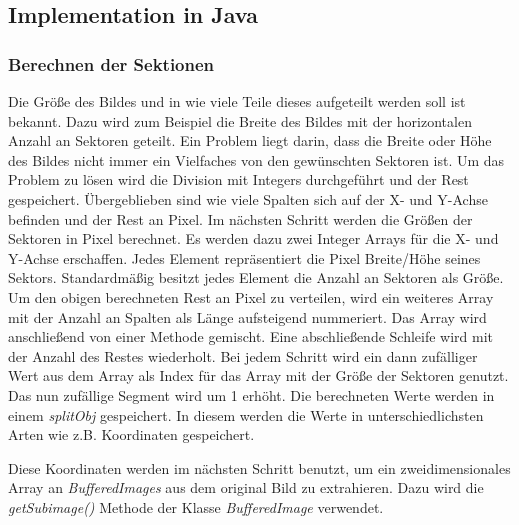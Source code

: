 \subsection{Implementation in Java}
\subsubsection{Berechnen der Sektionen}
Die Größe des Bildes und in wie viele Teile dieses aufgeteilt werden soll ist bekannt. Dazu wird zum Beispiel die Breite des Bildes mit der horizontalen Anzahl an Sektoren geteilt. Ein Problem liegt darin, dass die Breite oder Höhe des Bildes nicht immer ein Vielfaches von den gewünschten Sektoren ist. Um das Problem zu lösen wird die Division mit Integers durchgeführt und der Rest gespeichert. Übergeblieben sind wie viele Spalten sich auf der X- und Y-Achse befinden und der Rest an Pixel. Im nächsten Schritt werden die Größen der Sektoren in Pixel berechnet. Es werden dazu zwei Integer Arrays für die X- und Y-Achse erschaffen. Jedes Element repräsentiert die Pixel Breite/Höhe seines Sektors. Standardmäßig besitzt jedes Element die Anzahl an Sektoren als Größe. Um den obigen berechneten Rest an Pixel zu verteilen, wird ein weiteres Array mit der Anzahl an Spalten als Länge aufsteigend nummeriert. Das Array wird anschließend von einer Methode gemischt. Eine abschließende Schleife wird mit der Anzahl des Restes wiederholt. Bei jedem Schritt wird ein dann zufälliger Wert aus dem Array als Index für das Array mit der Größe der Sektoren genutzt. Das nun zufällige Segment wird um 1 erhöht. Die berechneten Werte werden in einem \textit{splitObj} gespeichert. In diesem werden die Werte in unterschiedlichsten Arten wie z.B. Koordinaten gespeichert. 

Diese Koordinaten werden im nächsten Schritt benutzt, um ein zweidimensionales Array an \textit{BufferedImages} aus dem original Bild zu extrahieren. Dazu wird die \textit{getSubimage()} Methode der Klasse \textit{BufferedImage} verwendet.


